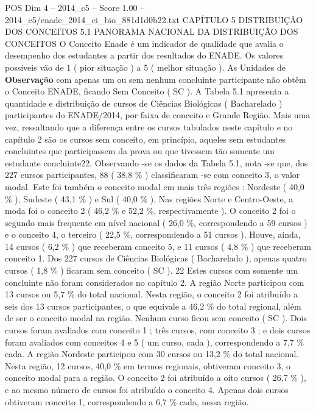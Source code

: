 \begin{textsample}{POS Dim 4 – 2014\_c5 – Score 1.00 – 2014\_c5/enade\_2014\_ci\_bio\_881d1d0b22.txt}  \label{ex:f4_pos_154}
CAPÍTULO 5 DISTRIBUIÇÃO DOS CONCEITOS 5.1 PANORAMA NACIONAL DA DISTRIBUIÇÃO DOS CONCEITOS O Conceito Enade é um indicador de qualidade que avalia o desempenho dos estudantes a partir dos resultados do ENADE.
Os valores possíveis vão de 1 ( pior situação ) a 5 ( melhor situação ).
As Unidades de \textbf{Observação} com apenas um ou sem nenhum concluinte participante não obtêm o Conceito ENADE, ficando Sem Conceito ( SC ).
A Tabela 5.1 apresenta a quantidade e distribuição de cursos de Ciências Biológicas ( Bacharelado ) participantes do ENADE/2014, por faixa de conceito e Grande Região.
Mais uma vez, ressaltando que a diferença entre os cursos tabulados neste capítulo e no capítulo 2 são os cursos sem conceito, em princípio, aqueles sem estudantes concluintes que participassem da prova ou que tivessem tão somente um estudante concluinte22.
Observando -se os dados da Tabela 5.1, nota -se que, dos 227 cursos participantes, 88 ( 38,8 \% ) classificaram -se com conceito 3, o valor modal.
Este foi também o conceito modal em mais três regiões : Nordeste ( 40,0 \% ), Sudeste ( 43,1 \% ) e Sul ( 40,0 \% ).
Nas regiões Norte e Centro-Oeste, a moda foi o conceito 2 ( 46,2 \% e 52,2 \%, respectivamente ).
O conceito 2 foi o segundo mais frequente em nível nacional ( 26,0 \%, correspondendo a 59 cursos ) e o conceito 4, o terceiro ( 22,5 \%, correspondendo a 51 cursos ).
Houve, ainda, 14 cursos ( 6,2 \% ) que receberam conceito 5, e 11 cursos ( 4,8 \% ) que receberam conceito 1.
Dos 227 cursos de Ciências Biológicas ( Bacharelado ), apenas quatro cursos ( 1,8 \% ) ficaram sem conceito ( SC ). 22 Estes cursos com somente um concluinte não foram considerados no capítulo 2.
A região Norte participou com 13 cursos ou 5,7 \% do total nacional.
Nesta região, o conceito 2 foi atribuído a seis dos 13 cursos participantes, o que equivale a 46,2 \% do total regional, além de ser o conceito modal na região.
Nenhum curso ficou sem conceito ( SC ).
Dois cursos foram avaliados com conceito 1 ; três cursos, com conceito 3 ; e dois cursos foram avaliados com conceitos 4 e 5 ( um curso, cada ), correspondendo a 7,7 \% cada.
A região Nordeste participou com 30 cursos ou 13,2 \% do total nacional.
Nesta região, 12 cursos, 40,0 \% em termos regionais, obtiveram conceito 3, o conceito modal para a região.
O conceito 2 foi atribuído a oito cursos ( 26,7 \% ), e ao mesmo número de cursos foi atribuído o conceito 4.
Apenas dois cursos obtiveram conceito 1, correspondendo a 6,7 \% cada, nessa região.

\end{textsample}

